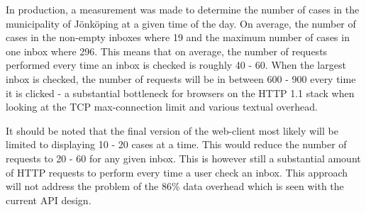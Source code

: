\documentclass{cslthse-msc}
\begin{document}
In production, a measurement was made to determine the number of cases in the municipality of Jönköping at a given time of the day. On average, the number of cases in the non-empty inboxes where 19 and the maximum number of cases in one inbox where 296. This means that on average, the number of requests performed every time an inbox is checked is roughly 40 - 60. When the largest inbox is checked, the number of requests will be in between 600 - 900 every time it is clicked - a substantial bottleneck for browsers on the HTTP 1.1 stack when looking at the TCP max-connection limit and various textual overhead.

It should be noted that the final version of the web-client most likely will be limited to displaying 10 - 20 cases at a time. This would reduce the number of requests to 20 - 60 for any given inbox. This is however still a substantial amount of HTTP requests to perform every time a user check an inbox. This approach will not address the problem of the 86\% data overhead which is seen with the current API design.

\cleardoublepage
{}
{}


\end{document}
